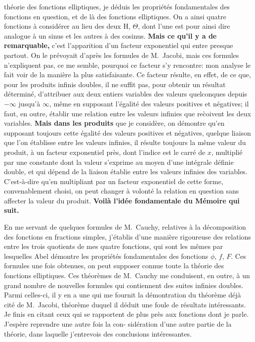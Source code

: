 \documentclass[11pt,a4paper]{book}
\begin{document}
th\'eorie des fonctions elliptiques, je d\'eduis les propri\'et\'es fondamentales des fonctions
en question, et de l\`a des fonctions elliptiques. On a ainsi quatre fonctions \`a consid\'erer
au lieu des deux H, $\Theta$, dont l'une est pour ainsi dire analogue \`a un sinus et les
autres \`a des cosinus. \textbf{Mais ce qu'il y a de remarquable,} c'est l'apparition d'un
facteur exponentiel qui entre presque partout. On le pr\'evoyait d'apr\`es les formules de
M.~Jacobi, mais ces formules n'expliquent pas, ce me semble, pourquoi ce facteur s'y
rencontre: mon analyse le fait voir de la mani\`ere la plus satisfaisante. Ce facteur
r\'esulte, en effet, de ce que, pour les produits infinis doubles, il ne suffit pas, pour
obtenir un r\'esultat d\'etermin\'e, d'attribuer aux deux entiers variables des valeurs quelconques
depuis $-\infty$ jusqu'\`a $\infty$, m\^eme en supposant l'\'egalit\'e des valeurs positives
et n\'egatives; il faut, en outre, \'etablir une relation entre les valeurs infinies que
re\`coivent les deux variables. \textbf{Mais dans les produits} que je consid\`ere, on d\'emontre
qu'en supposant toujours cette \'egalit\'e des valeurs positives et n\'egatives, quelque liaison
que l'on \'etablisse entre les valeurs infinies, il r\'esulte toujours la m\^eme valeur du
produit, \`a un facteur exponentiel pr\`es, dont l'indice est le carr\'e de $x$, multipli\'e par
une constante dont la valeur s'exprime au moyen d'une int\'egrale d\'efinie double, et qui
d\'epend de la liaison \'etablie entre les valeurs infinies des variables. C'est-\`a-dire qu'en
multipliant par un facteur exponentiel de cette forme, convenablement choisi, on peut
changer \`a volont\'e la relation en question sans affecter la valeur du produit. \textbf{Voil\`a
l'id\'ee fondamentale du M\'emoire qui suit.}

En me servant de quelques formules de M.~Cauchy, relatives \`a la d\'ecomposition
des fonctions en fractions simples, j'\'etablis d'une mani\`ere rigoureuse des relations entre
les trois quotients de mes quatre fonctions, qui sont les m\^emes par lesquelles Abel
d\'emontre les propri\'et\'es fondamentales des fonctions $\phi$, $f$, $F$. Ces formules une fois
obtenues, on peut supposer connue toute la th\'eorie des fonctions elliptiques. Ces
th\'eor\`emes de M.~Cauchy me conduisent, en outre, \`a un grand nombre de nouvelles
formules qui contiennent des suites infinies doubles. Parmi celles-ci, il y en a une
qui me fournit la d\'emontration du th\'eor\`eme d\'ej\`a cit\'e de M.~Jacobi, th\'eor\`eme duquel
il d\'eduit une foule de r\'esultats int\'eressants. Je finis en citant ceux qui se rapportent
de plus pr\`es aux fonctions dont je parle. J'esp\`ere reprendre une autre fois la con-
sid\'eration d'une autre partie de la th\'eorie, dans laquelle j'entrevois des conclusions
int\'eressantes.
\end{document}

